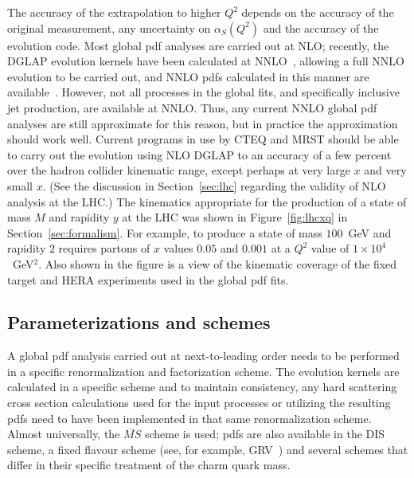 \documentclass[12pt]{iopart}
\def\as{\alpha_S}
\begin{document}
The accuracy of the extrapolation to higher $Q^2$ depends on the accuracy of the original measurement, any uncertainty on
$\as(Q^2)$ and the accuracy of the evolution code.  Most global pdf analyses are carried out at NLO; recently, the DGLAP
evolution kernels have been calculated at NNLO~\cite{Moch:2004sf}, allowing a full NNLO evolution to be carried out, and NNLO
pdfs calculated in this manner are available~\cite{Alekhin:2005gq,Martin:2002dr}. However, not all processes in the global
fits, and specifically inclusive jet production, are available at NNLO. Thus, any current NNLO global pdf analyses are still
approximate for this reason, but in practice the approximation should work well.  Current programs in use by CTEQ and MRST should
be able to carry out the evolution using NLO DGLAP to an accuracy of a few percent over the hadron collider kinematic range,
except perhaps at very large $x$ and very small $x$. (See the discussion in Section~\ref{sec:lhc} regarding the validity of NLO analysis at
the LHC.) The kinematics appropriate for the production of a state of mass  $M$ and rapidity $y$ at the LHC was shown in 
Figure~\ref{fig:lhcxq} in Section~\ref{sec:formalism}. For example,
to produce a state of mass $100$~GeV and rapidity $2$ requires partons of $x$
values $0.05$ and $0.001$ at a $Q^2$ value of $1 \times 10^4$~GeV$^2$. Also shown in the figure is a view of the kinematic
coverage of the fixed target and HERA experiments used in the global pdf fits. 

\subsection{Parameterizations and schemes}
\label{sec:schemes}

A global pdf analysis  carried out at next-to-leading order needs to be performed in a specific renormalization and
factorization   scheme. The evolution kernels are calculated in a specific scheme and  to maintain consistency, any hard scattering cross
section calculations used for the input processes or  utilizing the resulting pdfs need to have been implemented in that same 
renormalization scheme. Almost universally, the $\overline{MS}$ scheme is used;  pdfs are also available in the DIS scheme, a
fixed flavour scheme (see, for example,  GRV~\cite{Gluck:1998xa}) and several schemes that differ in their specific treatment of the charm
quark mass.
\end{document}
